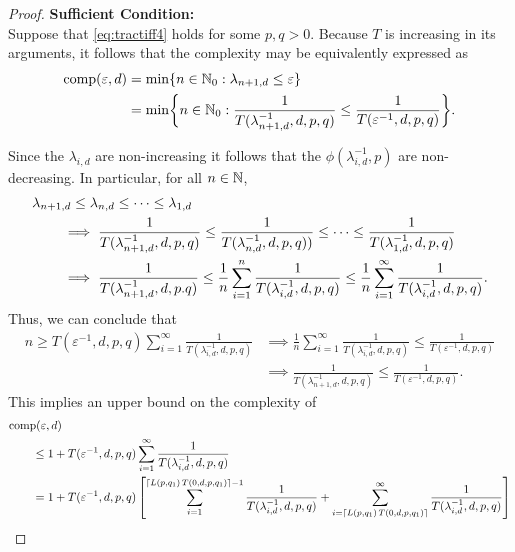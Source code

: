 \documentclass[11pt,a4paper]{article}
\begin{document}
\begin{proof}
    \textbf{Sufficient Condition:}\\ Suppose that \eqref{eq:tractiff4} holds for some $p,q>0$.
Because $T$ is increasing in its arguments, it follows that the complexity may be equivalently expressed as
\begin{align*}
    \operatorname{comp}(\varepsilon, d) &= \min \{n \in \mathbb{N}_{0} : \lambda_{n+1, d} \le \varepsilon\} \\
    &= \min \biggl\{n \in \mathbb{N}_{0} : \frac{1}{T(\lambda_{n+1, d}^{-1},d,p,q)} \le \frac{1}{T(\varepsilon^{-1},d,p,q)} \biggr\}.
\end{align*}

Since the $\lambda_{i,d}$ are non-increasing it follows that the $\phi(\lambda_{i, d}^{-1},p)$ are non-decreasing.
In particular, for all $n \in \mathbb{N}$,
\begin{align*}
    \MoveEqLeft{\lambda_{n+1,d} \le \lambda_{n,d} \le \cdots \le \lambda_{1,d}} \\
    & \implies \frac{1}{T(\lambda_{n+1, d}^{-1},d,p,q)} \le \frac{1}{T(\lambda_{n, d}^{-1},d,p,q))} \le \cdots \le \frac{1}{T(\lambda_{1, d}^{-1},d,p,q)} \\
    & \implies \frac{1}{T(\lambda_{n+1, d}^{-1},d,p.q)}
    \le \frac 1n \sum_{i=1}^n  \frac{1}{T(\lambda_{i, d}^{-1},d,p,q)}
    \le \frac 1n \sum_{i=1}^\infty  \frac{1}{T(\lambda_{i, d}^{-1},d,p,q)}.
\end{align*}
Thus, we can conclude that
\begin{align*}
    n \ge T(\varepsilon^{-1},d,p,q) \sum_{i=1}^\infty \frac{1}{T(\lambda_{i, d}^{-1},d,p,q)}
    & \implies
  \frac 1n \sum_{i=1}^\infty \frac{1}{T(\lambda_{i, d}^{-1},d,p,q)} \le  \frac{1}{T(\varepsilon^{-1},d,p,q)} \\
   & \implies   \frac{1}{T(\lambda_{n+1, d}^{-1},d,p,q)} \le \frac{1}{T(\varepsilon^{-1},d,p,q)}.
\end{align*}
This implies an upper bound on the complexity of
\begin{align*}
       \MoveEqLeft{\comp(\varepsilon,d)} \\
       &\le 1 + T(\varepsilon^{-1},d,p,q) \sum_{i=1}^\infty \frac{1}{T(\lambda_{i, d}^{-1},d,p,q)} \\
       & = 1 + T(\varepsilon^{-1},d,p,q) \left [ \sum_{i=1}^{\lceil L(p,q_1)\, T(0,d,p,q_1)\rceil -1} \frac{1}{T(\lambda_{i, d}^{-1},d,p,q)}
       + \sum_{i=\lceil L(p,q_1)\, T(0,d,p,q_1) \rceil}^\infty \frac{1}{T(\lambda_{i, d}^{-1},d,p,q)} \right ] \\

\end{align*}
\end{proof}
\end{document}
